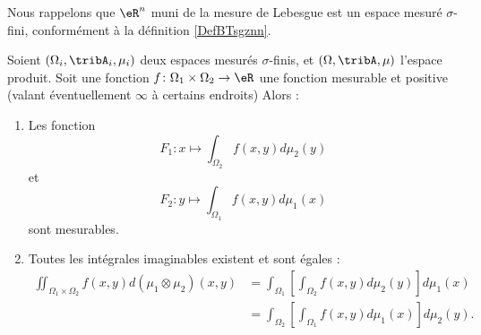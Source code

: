 Nous rappelons que \( \eR^n\) muni de la mesure de Lebesgue est un espace mesuré \( \sigma\)-fini, conformément à la définition \ref{DefBTsgznn}.

\begin{theorem}\label{ThoWTMSthY}
    Soient \( (\Omega_i,\tribA_i,\mu_i)\) deux espaces mesurés \( \sigma\)-finis, et \( (\Omega,\tribA,\mu)\) l'espace produit. Soit une fonction \( f\colon \Omega_1\times \Omega_2\to \eR\) une fonction mesurable et positive (valant éventuellement \( \infty\) à certains endroits)
    Alors :
    \begin{enumerate}
        \item
            Les fonction
            \begin{equation}
                F_1\colon x\mapsto \int_{\Omega_2}f(x,y)d\mu_2(y)
            \end{equation}
            et
            \begin{equation}
                F_2\colon y\mapsto \int_{\Omega_1}f(x,y)d\mu_1(x)
            \end{equation}
            sont mesurables.
        \item
            Toutes les intégrales imaginables existent et sont égales :
            \begin{subequations}    \label{EqJRVtOGx}
                \begin{align}
                    \iint_{\Omega_1\times \Omega_2}f(x,y)d(\mu_1\otimes \mu_2)(x,y)&=\int_{\Omega_1}\left[ \int_{\Omega_2}f(x,y)d\mu_2(y) \right]d\mu_1(x)\\
                &=\int_{\Omega_2}\left[ \int_{\Omega_1}f(x,y)d\mu_1(x) \right]d\mu_2(y).
                \end{align}
            \end{subequations}
    \end{enumerate}
\end{theorem}

